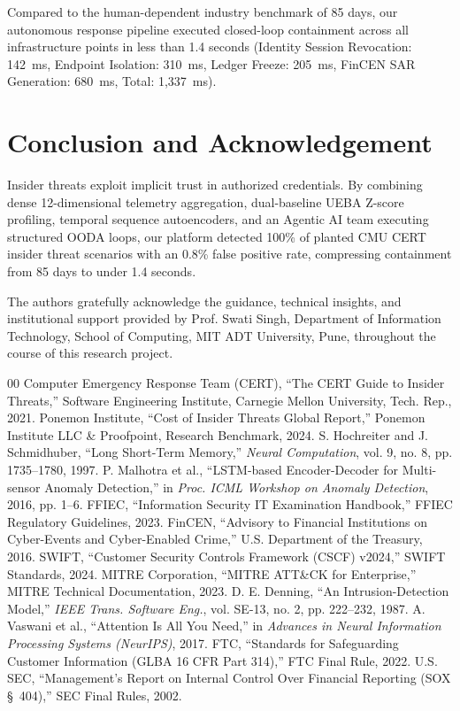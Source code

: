 \documentclass[conference]{IEEEtran}
\begin{document}
Compared to the human-dependent industry benchmark of 85 days, our autonomous response pipeline executed closed-loop containment across all infrastructure points in less than 1.4 seconds (Identity Session Revocation: 142~ms, Endpoint Isolation: 310~ms, Ledger Freeze: 205~ms, FinCEN SAR Generation: 680~ms, Total: 1,337~ms).

\section{Conclusion and Acknowledgement}
Insider threats exploit implicit trust in authorized credentials. By combining dense 12-dimensional telemetry aggregation, dual-baseline UEBA Z-score profiling, temporal sequence autoencoders, and an Agentic AI team executing structured OODA loops, our platform detected 100\% of planted CMU CERT insider threat scenarios with an 0.8\% false positive rate, compressing containment from 85 days to under 1.4 seconds.

The authors gratefully acknowledge the guidance, technical insights, and institutional support provided by Prof. Swati Singh, Department of Information Technology, School of Computing, MIT ADT University, Pune, throughout the course of this research project.

\begin{thebibliography}{00}
 Computer Emergency Response Team (CERT), ``The CERT Guide to Insider Threats,'' Software Engineering Institute, Carnegie Mellon University, Tech. Rep., 2021.
 Ponemon Institute, ``Cost of Insider Threats Global Report,'' Ponemon Institute LLC \& Proofpoint, Research Benchmark, 2024.
 S. Hochreiter and J. Schmidhuber, ``Long Short-Term Memory,'' \textit{Neural Computation}, vol. 9, no. 8, pp. 1735--1780, 1997.
 P. Malhotra et al., ``LSTM-based Encoder-Decoder for Multi-sensor Anomaly Detection,'' in \textit{Proc. ICML Workshop on Anomaly Detection}, 2016, pp. 1--6.
 FFIEC, ``Information Security IT Examination Handbook,'' FFIEC Regulatory Guidelines, 2023.
 FinCEN, ``Advisory to Financial Institutions on Cyber-Events and Cyber-Enabled Crime,'' U.S. Department of the Treasury, 2016.
 SWIFT, ``Customer Security Controls Framework (CSCF) v2024,'' SWIFT Standards, 2024.
 MITRE Corporation, ``MITRE ATT\&CK for Enterprise,'' MITRE Technical Documentation, 2023.
 D. E. Denning, ``An Intrusion-Detection Model,'' \textit{IEEE Trans. Software Eng.}, vol. SE-13, no. 2, pp. 222--232, 1987.
 A. Vaswani et al., ``Attention Is All You Need,'' in \textit{Advances in Neural Information Processing Systems (NeurIPS)}, 2017.
 FTC, ``Standards for Safeguarding Customer Information (GLBA 16 CFR Part 314),'' FTC Final Rule, 2022.
 U.S. SEC, ``Management's Report on Internal Control Over Financial Reporting (SOX \S~404),'' SEC Final Rules, 2002.
\end{thebibliography}
\end{document}

